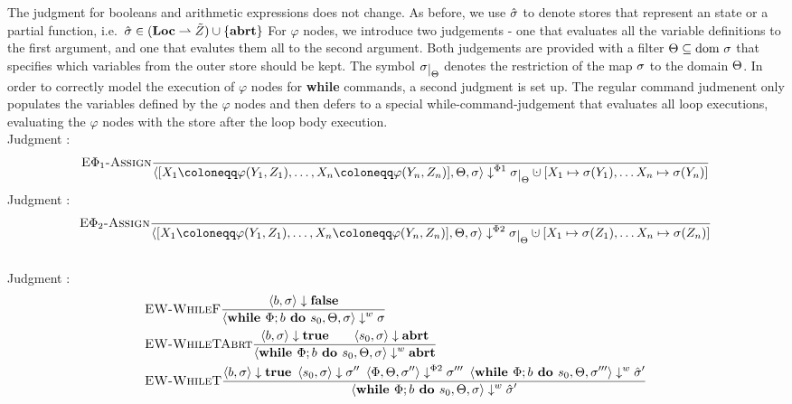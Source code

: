 The judgment for booleans and arithmetic expressions does not change.
As before, we use $\hat{\sigma}{}$ to denote stores that represent an \exception{}
state or a partial function, i.e.\ $\hat{\sigma}{} \in (\textbf{Loc} \rightharpoonup \tilde{Z}) \cup \{\textbf{abrt}\}$
For $\varphi$ nodes, we introduce two judgements - one that evaluates all the variable definitions
to the first argument, and one that evalutes them all to the second argument.
Both judgements are provided with a filter $\Theta \subseteq \text{dom }{\sigma}$ that specifies which variables 
from the outer store should be kept.
The symbol $\store\restrict{\filter}$ denotes the restriction of the map $\sigma$
to the domain $\Theta$.
In order to correctly model the execution of $\varphi$ nodes for \textbf{while} commands,
a second judgment is set up.
The regular command judmenent only populates the variables defined by the $\varphi$ nodes
and then defers to a special while-command-judgement that evaluates all loop executions,
evaluating the $\varphi$ nodes with the store after the loop body execution.
\\
Judgment :
\begin{align*}
    &\bsrule{E$\Phi_1$-Assign}{}
    {\bigsteppl{\defaultphilistn}{\filter}{\store}{\storeassign{\store\restrict{\filter}}{X_1 \mapsto \store(Y_1),\ldots X_n \mapsto \store(Y_n)}}}\\
\end{align*}
Judgment :
\begin{align*}
    &\bsrule{E$\Phi_2$-Assign}{}
    {\bigsteppr{\defaultphilistn}{\filter}{\store}{\storeassign{\store\restrict{\filter}}{X_1 \mapsto \store(Z_1),\ldots X_n \mapsto \store(Z_n)}}}\\
\end{align*}
\\
Judgment :
\begin{align*}
    &\textsc{EW-WhileF}\frac{\displaystyle \langle b, \sigma \rangle \downarrow \textbf{false}}{\displaystyle \langle \textbf{while }\Phi;{b} \textbf{ do } {s_0}, \Theta, \sigma \rangle \downarrow^w \sigma}\qquad\\
    &\textsc{EW-WhileTAbrt}\frac{\displaystyle \langle b, \sigma \rangle \downarrow \textbf{true} \qquad 
    \langle s_0, \sigma \rangle \downarrow \textbf{abrt}}{\displaystyle \langle \textbf{while }\Phi;{b} \textbf{ do } {s_0}, \Theta, \sigma \rangle \downarrow^w \textbf{abrt}}\\
    &\textsc{EW-WhileT}\frac{\displaystyle \langle b, \sigma \rangle \downarrow \textbf{true} \enskip
    \langle s_0, \sigma \rangle \downarrow \sigma'' \enskip
    \langle \Phi, \Theta, \sigma'' \rangle \downarrow^{\Phi2} \sigma''' \enskip
    \langle \textbf{while }\Phi;{b} \textbf{ do } {s_0}, \Theta, \sigma''' \rangle \downarrow^w \hat{\sigma}'}{\displaystyle \langle \textbf{while }\Phi;{b} \textbf{ do } {s_0}, \Theta, \sigma \rangle \downarrow^w \hat{\sigma}'}
\end{align*}
